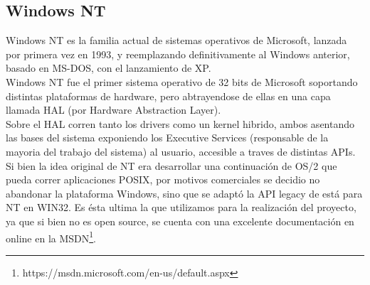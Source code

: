 \subsection{Windows NT}

Windows NT es la familia actual de sistemas operativos de Microsoft, lanzada
por primera vez en 1993, y reemplazando definitivamente al Windows anterior,
basado en MS-DOS, con el lanzamiento de XP.\\

Windows NT fue el primer sistema operativo de 32 bits de Microsoft soportando
distintas plataformas de hardware, pero abtrayendose de ellas en una capa
llamada HAL (por Hardware Abstraction Layer).\\

Sobre el HAL corren tanto los drivers como un kernel hibrido, ambos asentando
las bases del sistema exponiendo los Executive Services (responsable de la
mayoria del trabajo del sistema) al usuario, accesible a traves de distintas
APIs.\\

Si bien la idea original de NT era desarrollar una continuación de OS/2 que
pueda correr aplicaciones POSIX, por motivos comerciales se decidio no abandonar
la plataforma Windows, sino que se adaptó la API legacy de está para NT en
WIN32. Es ésta ultima la que utilizamos para la realización del proyecto, ya que
si bien no es open source, se cuenta con una excelente documentación en online
en la MSDN\footnote{https://msdn.microsoft.com/en-us/default.aspx}.\\

